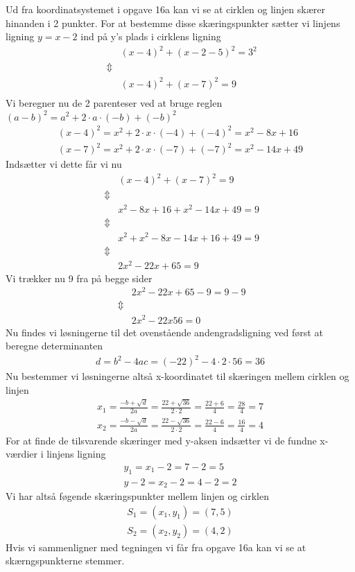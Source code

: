  Ud fra koordinatsystemet i opgave 16a kan vi se at cirklen og linjen skærer hinanden i 2 punkter. For at bestemme disse skæringspunkter sætter vi linjens ligning $y = x-2$ ind på y's plads i cirklens ligning
 \begin{align*}
     &(x-4)^2 + (x-2-5)^2 = 3^2\\
     \; \Updownarrow &\\
     &(x-4)^2 + (x-7)^2 = 9\\
 \end{align*}
 Vi beregner nu de 2 parenteser ved at bruge reglen $(a-b)^2 = a^2+2\cdot a\cdot (-b) + (-b)^2$
 \begin{align*}
     (x-4)^2 = x^2 +2\cdot x \cdot (-4) + (-4)^2 = x^2 -8x + 16\\
     (x-7)^2 = x^2 +2\cdot x \cdot (-7) + (-7)^2 = x^2 -14x + 49
 \end{align*}
 Indsætter vi dette får vi nu
 \begin{align*}
    &(x-4)^2 + (x-7)^2 = 9\\
    \; \Updownarrow &\\ 
    &x^2-8x+16+x^2-14x+49 = 9\\
    \; \Updownarrow &\\
    &x^2+x^2 -8x - 14x + 16+49=9\\
    \; \Updownarrow &\\
    &2x^2 - 22x + 65 = 9
 \end{align*}
 Vi trækker nu 9 fra på begge sider 
 \begin{align*}
     &2x^2 -22x +65-9 = 9-9\\
     \; \Updownarrow &\\
     &2x^2 -22x 56 = 0
 \end{align*}
 Nu findes vi løsningerne til det ovenstående andengradsligning ved først at beregne determinanten 
 \begin{align*}
     d = b^2 -4ac = (-22)^2 -4\cdot 2\cdot 56 = 36
 \end{align*}
 Nu bestemmer vi løsningerne altså x-koordinatet til skæringen mellem cirklen og linjen
 \begin{align*}
     x_1 = \frac{-b+\sqrt{d}}{2a}=\frac{22+\sqrt{36}}{2\cdot 2}=\frac{22+6}{4}=\frac{28}{4}=7\\
     x_2 = \frac{-b-\sqrt{d}}{2a}=\frac{22-\sqrt{36}}{2\cdot 2}=\frac{22-6}{4}=\frac{16}{4} = 4
 \end{align*}
 For at finde de tilsvarende skæringer med y-aksen indsætter vi de fundne x-værdier i linjens ligning
 \begin{align*}
     y_1 = x_1 -2 = 7-2 = 5\\
     y-2 = x_2 -2 = 4-2 = 2
 \end{align*}
 Vi har altså føgende skæringspunkter mellem linjen og cirklen
 \begin{align*}
     S_1=(x_1, y_1)=(7,5)\\
     S_2 =(x_2,y_2)=(4,2)
 \end{align*}
 Hvis vi sammenligner med tegningen vi får fra opgave 16a kan vi se at skærngspunkterne stemmer.